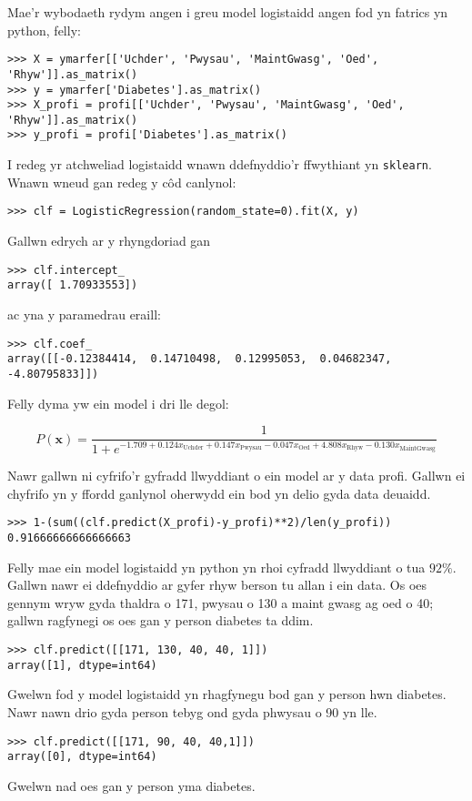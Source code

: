 Mae'r wybodaeth rydym angen i greu model logistaidd angen fod yn fatrics yn python, felly:

\begin{verbatim}
>>> X = ymarfer[['Uchder', 'Pwysau', 'MaintGwasg', 'Oed', 'Rhyw']].as_matrix()
>>> y = ymarfer['Diabetes'].as_matrix()
>>> X_profi = profi[['Uchder', 'Pwysau', 'MaintGwasg', 'Oed', 'Rhyw']].as_matrix()
>>> y_profi = profi['Diabetes'].as_matrix()
\end{verbatim}

I redeg yr atchweliad logistaidd wnawn ddefnyddio'r ffwythiant yn \texttt{sklearn}. Wnawn wneud gan redeg y c\^{o}d canlynol:

\begin{verbatim}
>>> clf = LogisticRegression(random_state=0).fit(X, y)
\end{verbatim}

Gallwn edrych ar y rhyngdoriad gan

\begin{verbatim}
>>> clf.intercept_
array([ 1.70933553])
\end{verbatim}

ac yna y paramedrau eraill:

\begin{verbatim}
>>> clf.coef_
array([[-0.12384414,  0.14710498,  0.12995053,  0.04682347, -4.80795833]])
\end{verbatim}

Felly dyma yw ein model i dri lle degol:

$$ P(\mathbf{x}) = \frac{1}{1 + e^{-1.709 + 0.124 x_{\text{Uchder}} + 0.147 x_{\text{Pwysau}} - 0.047 x_{\text{Oed}} + 4.808 x_{\text{Rhyw}} - 0.130 x_{\text{MaintGwasg}}}} $$

Nawr gallwn ni cyfrifo'r gyfradd llwyddiant o ein model ar y data profi. Gallwn ei chyfrifo yn y ffordd ganlynol oherwydd ein bod yn delio gyda data deuaidd.

\begin{verbatim}
>>> 1-(sum((clf.predict(X_profi)-y_profi)**2)/len(y_profi))
0.91666666666666663
\end{verbatim}

Felly mae ein model logistaidd yn python yn rhoi cyfradd llwyddiant o tua $92\%$. Gallwn nawr ei ddefnyddio ar gyfer rhyw berson tu allan i ein data. Os oes gennym wryw gyda thaldra o 171, pwysau o 130 a maint gwasg ag oed o 40; gallwn ragfynegi os oes gan y person diabetes ta ddim. 

\begin{verbatim}
>>> clf.predict([[171, 130, 40, 40, 1]])
array([1], dtype=int64)
\end{verbatim}

Gwelwn fod y model logistaidd yn rhagfynegu bod gan y person hwn diabetes. Nawr nawn drio gyda person tebyg ond gyda phwysau o 90 yn lle.

\begin{verbatim}
>>> clf.predict([[171, 90, 40, 40,1]])
array([0], dtype=int64)
\end{verbatim}

Gwelwn nad oes gan y person yma diabetes.
